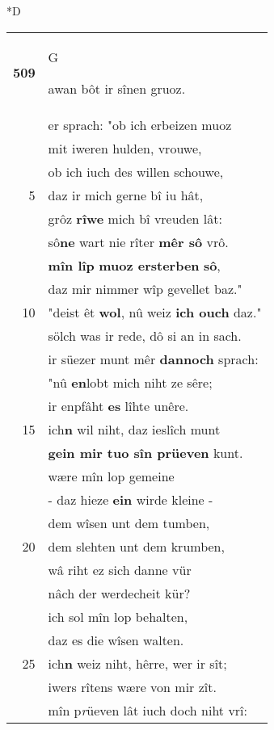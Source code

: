 \documentclass[8pt,a4paper,notitlepage]{article}
\begin{document}
\begin{table}[ht]
\begin{minipage}[t]{0.5\linewidth}
\small
\begin{center}*D
\end{center}
\begin{tabular}{rl}
\textbf{509} & \begin{large}G\end{large}awan bôt ir sînen gruoz.\\ 
 & er sprach: "ob ich erbeizen muoz\\ 
 & mit iweren hulden, vrouwe,\\ 
 & ob ich iuch des willen schouwe,\\ 
5 & daz ir mich gerne bî iu hât,\\ 
 & grôz \textbf{rîwe} mich bî vreuden lât:\\ 
 & sô\textbf{ne} wart nie rîter \textbf{mêr sô} vrô.\\ 
 & \textbf{mîn lîp} \textbf{muoz ersterben} \textbf{sô},\\ 
 & daz mir nimmer wîp gevellet baz."\\ 
10 & "deist êt \textbf{wol}, nû weiz \textbf{ich ouch} daz."\\ 
 & sölch was ir rede, dô si an in sach.\\ 
 & ir süezer munt mêr \textbf{dannoch} sprach:\\ 
 & "nû \textbf{en}lobt mich niht ze sêre;\\ 
 & ir enpfâht \textbf{es} lîhte unêre.\\ 
15 & ich\textbf{n} wil niht, daz ieslîch munt\\ 
 & \textbf{gein mir tuo sîn prüeven} kunt.\\ 
 & wære mîn lop gemeine\\ 
 & - daz hieze \textbf{ein} wirde kleine -\\ 
 & dem wîsen unt dem tumben,\\ 
20 & dem slehten unt dem krumben,\\ 
 & wâ riht ez sich danne vür\\ 
 & nâch der werdecheit kür?\\ 
 & ich sol mîn lop behalten,\\ 
 & daz es die wîsen walten.\\ 
25 & ich\textbf{n} weiz niht, hêrre, wer ir sît;\\ 
 & iwers rîtens wære von mir zît.\\ 
 & mîn p\textit{r}üeven lât iuch doch niht vrî:\\ 

\end{tabular}
\end{minipage}
\end{table}
\end{document}
